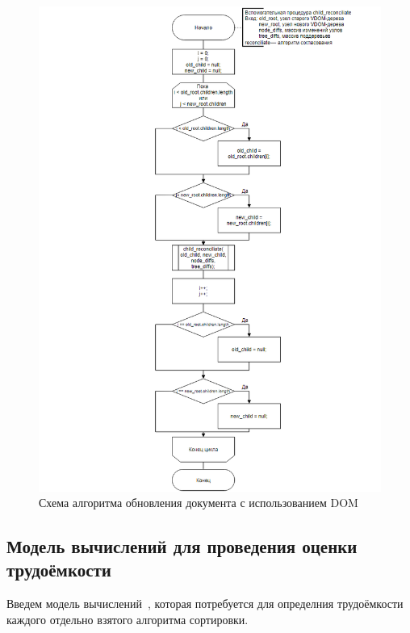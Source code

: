 \begin{figure}[h]
	\centering
	\includegraphics[width=160mm]{img/child-reconciliation-algorithm.png}
	\caption{Схема алгоритма обновления документа с использованием DOM}
	\label{fig:child-reconciliation-algorithm}
\end{figure}

\clearpage

\subsection{Модель вычислений для проведения оценки трудоёмкости}

Введем модель вычислений~\cite{model}, которая потребуется для определния трудоёмкости каждого отдельно взятого алгоритма сортировки.

